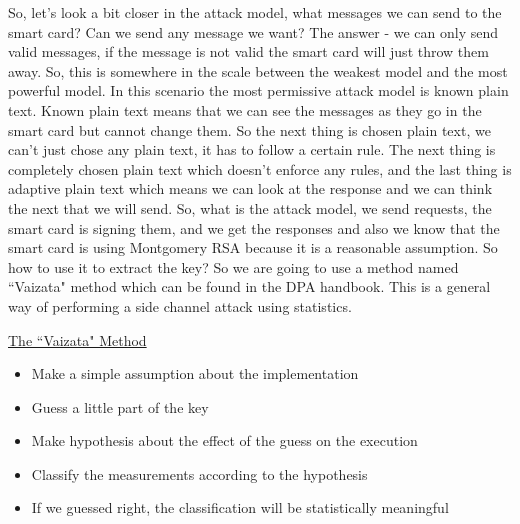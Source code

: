So, let's look a bit closer in the attack model, what messages we can send to
the smart card? Can we send any message we want? The answer - we can only send
valid messages, if the message is not valid the smart card will just throw them
away. So, this is somewhere in the scale between the weakest model and the most
powerful model. In this scenario the most permissive attack model is known plain
text. Known plain text means that we can see the messages as they go in the
smart card but cannot change them. So the next thing is chosen plain text, we
can't  just chose any plain text, it has to follow a certain rule. The next
thing is completely chosen plain text which doesn't enforce any rules, and the
last thing is adaptive plain text which means we can look at the response and we
can think the next that we will send. So, what is the attack model, we send
requests, the smart card is signing them, and we get the responses and also we
know that the smart card is using Montgomery RSA because it is a reasonable
assumption. So how to use it to extract the key? So we are going to use a method
named ``Vaizata" method which can be found in the DPA handbook. This is a
general way of performing a side channel attack using statistics. \newline

\underline{The ``Vaizata" Method}
\begin{itemize}
	\item Make a simple assumption about the implementation
	\item Guess a little part of the key
	\item Make hypothesis about the effect of the guess on the execution
	\item Classify the measurements according to the hypothesis
	\item If we guessed right, the classification will be statistically
	meaningful
\end{itemize}


